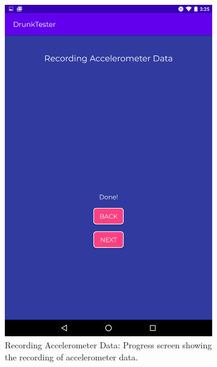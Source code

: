 \documentclass[12pt,a4paper]{article}
\begin{document}
\begin{figure}[htb!]
    \begin{subfigure}[b]{0.35\textwidth}
        \includegraphics[width=\textwidth]{materials/Recording_accelerometer_data_done.png}
        \caption*{Recording Accelerometer Data: Progress screen showing the recording of accelerometer data.}
    \end{subfigure}
    \hfill
    \begin{subfigure}[b]{0.35\textwidth}

\end{subfigure}
\end{figure}
\end{document}
